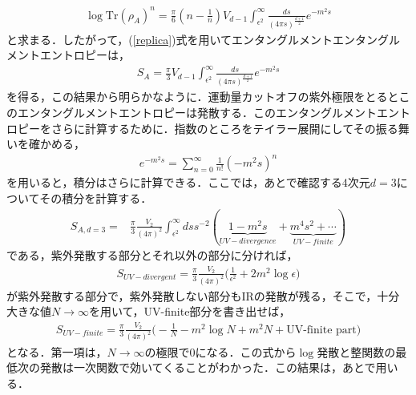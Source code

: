 \begin{align}
  \log\mathrm{Tr}(\rho_{A})^{n}=\frac{\pi}{6}(n-\frac{1}{n})V_{d-1}\int^{\infty}_{\epsilon^2}\frac{ds}{(4\pi s)^{\frac{d+1}{2}}}e^{-m^2s}
\end{align}
と求まる．したがって，(\ref{replica})式を用いてエンタングルメントエンタングルメントエントロピーは，
\begin{align}
  S_A=\frac{\pi}{3}V_{d-1}\int^{\infty}_{\epsilon^2}\frac{ds}{(4\pi s)^{\frac{d+1}{2}}}e^{-m^2s}
\end{align}
を得る，この結果から明らかなように．運動量カットオフの紫外極限をとるとこのエンタングルメントエントロピーは発散する．このエンタングルメントエントロピーをさらに計算するために．指数のところをテイラー展開にしてその振る舞いを確かめる，
\begin{align}
  e^{-m^2s}=\sum_{n=0}^{\infty}\frac{1}{n!}(-m^2s)^n
\end{align}
を用いると，積分はさらに計算できる．ここでは，あとで確認する4次元$d=3$についてその積分を計算する．
\begin{align}
  S_{A,d=3}=&\frac{\pi}{3}\frac{V_{2}}{(4\pi)^2}\int^{\infty}_{\epsilon^2}ds s^{-2}(\underbrace{1-m^2s}_{UV-divergence}+\underbrace{m^4s^2+\cdots}_{UV-finite})
\end{align}
である，紫外発散する部分とそれ以外の部分に分ければ，
\begin{align}
  S_{UV-divergent}=\frac{\pi}{3}\frac{V_{2}}{(4\pi)^2}\biggl(\frac{1}{\epsilon^2}+2m^2\log\epsilon \biggr)
\end{align}
が紫外発散する部分で，紫外発散しない部分もIRの発散が残る，そこで，十分大きな値$N\to \infty$を用いて，UV-finite部分を書き出せば，
\begin{align}
  S_{UV-finite}=\frac{\pi}{3}\frac{V_{2}}{(4\pi)^2}\biggl(-\frac{1}{N}-m^2\log N+m^2N+\mbox{UV-finite part}\biggr)
\end{align}
となる．第一項は，$N\to\infty$の極限で$0$になる．この式から$\log$発散と整関数の最低次の発散は一次関数で効いてくることがわかった．この結果は，あとで用いる．
